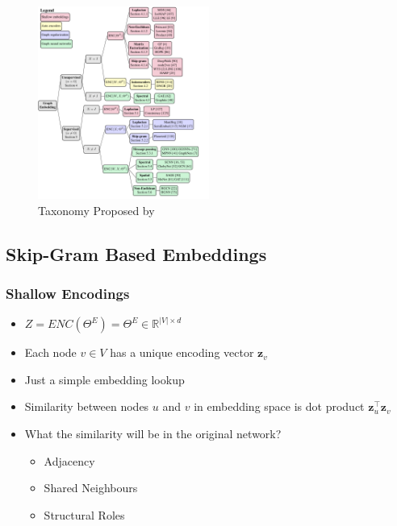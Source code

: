 \documentclass{beamer}
\begin{document}
\begin{frame}
    \frametitle{}
    \label{slide:taxonomy}
    \begin{figure}[htp]
        \centering
        \includegraphics[width=0.5\textwidth]{images/taxonomy-crop.pdf}
        \caption{Taxonomy Proposed by \cite{chami2020machine}}
    \end{figure}

\end{frame}

\subsection{Skip-Gram Based Embeddings}

\begin{frame}
    \frametitle{Shallow Encodings}
    \begin{itemize}
        \item $Z = ENC(\Theta^{E}) = \Theta^{E} \in \mathbb{R}^{|V|\times d}$
        \item Each node $v \in V$ has a unique encoding vector $\mathbf{z}_{v}$ 
        \item Just a simple embedding lookup
        \item Similarity between nodes $u$ and $v$ in embedding space is dot product $\mathbf{z}_{u}^{\top}\mathbf{z}_{v} $
        \item What the similarity will be in the original network?
        \begin{itemize}
            \item Adjacency
            \item Shared Neighbours
            \item Structural Roles
        \end{itemize}
    \end{itemize}
\end{frame}
\end{document}
